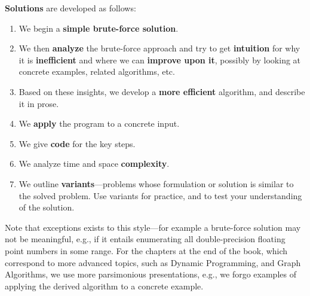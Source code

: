 \documentclass[10pt,openany,twoside,letterpaper,extrafontsizes]{memoir}
\begin{document}
\begin{Spacing}{\introSpacing}
\noindent\textbf{Solutions} are developed as follows:
\begin{enumerate}[label=(\arabic*.), ref=(\arabic*.)]
\item We begin a \textbf{simple brute-force solution}.
\item We then \textbf{analyze} the brute-force approach and try to get \textbf{intuition} for why
it is \textbf{inefficient} and where we can \textbf{improve upon it}, possibly by looking at concrete examples, related algorithms, etc.
\item Based on these insights, we develop a \textbf{more efficient} algorithm, and describe it in prose.
\item We \textbf{apply} the program to a concrete input.
\item We give \textbf{code} for the key steps.
\item We analyze time and space \textbf{complexity}.
\item We outline \textbf{variants}---problems whose
formulation or solution is similar to the solved problem.  Use
variants for practice, and to test your understanding of the solution.
\end{enumerate}

Note that exceptions exists to this style---for example a brute-force solution may not be meaningful, e.g., if it entails enumerating all double-precision floating point numbers in some range.
For the chapters at the end of the book, which correspond to more advanced topics, such as Dynamic Programming, and Graph Algorithms, we use more parsimonious presentations, e.g.,
we forgo examples of applying the derived algorithm to a concrete example.



\end{Spacing}
\end{document}
